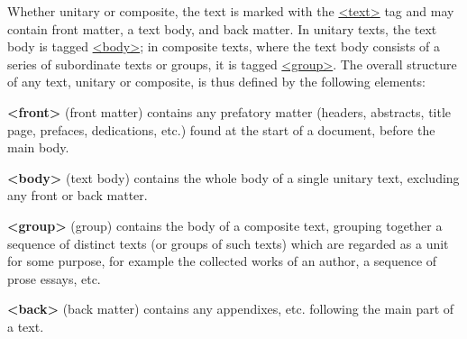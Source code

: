 Whether unitary or composite, the text is marked with the \hyperref[TEI.text]{<text>} tag and may contain front matter, a text body, and back matter. In unitary texts, the text body is tagged \hyperref[TEI.body]{<body>}; in composite texts, where the text body consists of a series of subordinate texts or groups, it is tagged \hyperref[TEI.group]{<group>}. The overall structure of any text, unitary or composite, is thus defined by the following elements: 
\begin{sansreflist}
  
\item [\textbf{<front>}] (front matter) contains any prefatory matter (headers, abstracts, title page, prefaces, dedications, etc.) found at the start of a document, before the main body.
\item [\textbf{<body>}] (text body) contains the whole body of a single unitary text, excluding any front or back matter.
\item [\textbf{<group>}] (group) contains the body of a composite text, grouping together a sequence of distinct texts (or groups of such texts) which are regarded as a unit for some purpose, for example the collected works of an author, a sequence of prose essays, etc.
\item [\textbf{<back>}] (back matter) contains any appendixes, etc. following the main part of a text.
\end{sansreflist}
\par
